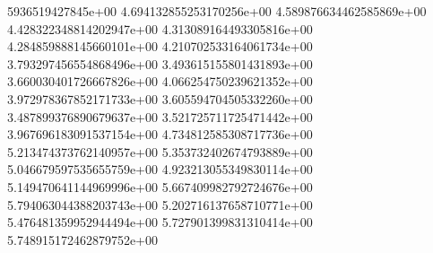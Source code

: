 5936519427845e+00	4.694132855253170256e+00	4.589876634462585869e+00	4.428322348814202947e+00	4.313089164493305816e+00	4.284859888145660101e+00	4.210702533164061734e+00	3.793297456554868496e+00	3.493615155801431893e+00	3.660030401726667826e+00	4.066254750239621352e+00	3.972978367852171733e+00	3.605594704505332260e+00	3.487899376890679637e+00	3.521725711725471442e+00	3.967696183091537154e+00	4.734812585308717736e+00	5.213474373762140957e+00	5.353732402674793889e+00	5.046679597535655759e+00	4.923213055349830114e+00	5.149470641144969996e+00	5.667409982792724676e+00	5.794063044388203743e+00	5.202716137658710771e+00	5.476481359952944494e+00	5.727901399831310414e+00	5.748915172462879752e+00

